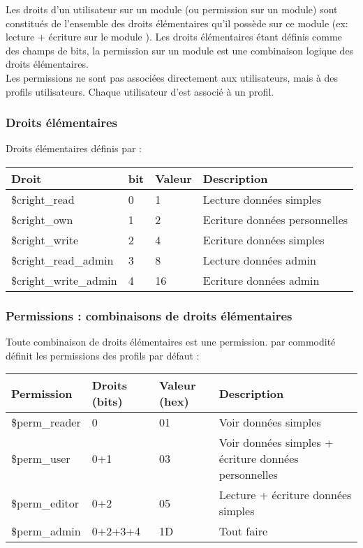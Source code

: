Les droits d'un utilisateur sur un module (ou permission sur un module) sont constitués de l'ensemble des droits élémentaires qu'il possède sur ce module (ex: lecture + écriture sur le module \company).
Les droits élémentaires étant définis comme des champs de bits, la permission sur un module est une combinaison logique des droits élémentaires.\\

Les permissions ne sont pas associées directement aux utilisateurs, mais à des profils utilisateurs. Chaque utilisateur d'\obm est associé à un profil.


\subsubsection{Droits élémentaires}

Droits élémentaires définis par \obm :\\

\begin{tabular}{|p{3cm}|p{2cm}|p{2cm}|p{5cm}|}
\hline
\textbf{Droit} & \textbf{bit} & \textbf{Valeur} & \textbf{Description} \\
\hline
\$cright\_read & 0 & 1 & Lecture données simples \\ 
\hline
\$cright\_own & 1 & 2 & Ecriture données personnelles \\ 
\hline
\$cright\_write & 2 & 4 & Ecriture données simples \\ 
\hline
\$cright\_read\_admin & 3 & 8 & Lecture données admin \\ 
\hline
\$cright\_write\_admin & 4 & 16 & Ecriture données admin \\ 
\hline
\end{tabular}

\subsubsection{Permissions : combinaisons de droits élémentaires}

Toute combinaison de droits élémentaires est une permission.
\obm par commodité définit les permissions des profils par défaut :\\

\begin{tabular}{|p{3cm}|p{2.5cm}|p{2.2cm}|p{5cm}|}
\hline
\textbf{Permission} & \textbf{Droits (bits)} & \textbf{Valeur (hex)} & \textbf{Description} \\
\hline
\$perm\_reader & 0 & 01 & Voir données simples \\ 
\hline
\$perm\_user & 0+1 & 03 & Voir données simples + écriture données personnelles \\ 
\hline
\$perm\_editor & 0+2 & 05 & Lecture + écriture données simples \\ 
\hline
\$perm\_admin & 0+2+3+4 & 1D & Tout faire \\ 
\hline
\end{tabular}


